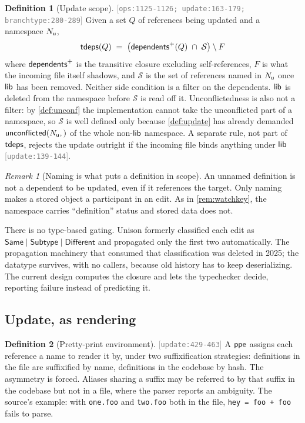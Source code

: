 \documentclass[11pt]{article}
\theoremstyle{definition}
\newtheorem{definition}{Definition}[section]
\theoremstyle{plain}
\theoremstyle{remark}
\newtheorem{remark}{Remark}[section]
\newcommand{\src}[1]{{\footnotesize\textcolor{gray}{[\texttt{#1}]}}}
\begin{document}
\begin{definition}[Update scope]\label{def:uscope}
\src{ops:1125-1126; update:163-179; branchtype:280-289} Given a set $Q$ of references being updated
and a namespace $N_{\mathsf{u}}$,
\[
  \mathsf{tdeps}(Q) \;=\; \bigl(\mathsf{dependents}^{+}(Q) \;\cap\; \mathcal{S}\bigr) \setminus F
\]
where $\mathsf{dependents}^{+}$ is the transitive closure excluding self-references, $F$ is what the incoming
file itself shadows, and $\mathcal{S}$ is the set of references named in $N_{\mathsf{u}}$ once $\mathsf{lib}$ has
been removed. Neither side condition is a filter on the dependents. $\mathsf{lib}$ is deleted from the
namespace before $\mathcal{S}$ is read off it. Unconflictedness is also not a filter: by
\cref{def:unconf} the implementation cannot take the unconflicted part of a namespace, so
$\mathcal{S}$ is well defined only because \cref{def:update} has already demanded
$\mathsf{unconflicted}(N_{\mathsf{u}},)$ of the whole non-$\mathsf{lib}$ namespace. A separate rule, not part of $\mathsf{tdeps}$, rejects
the update outright if the incoming file binds anything under $\mathsf{lib}$ \src{update:139-144}.
\end{definition}

\begin{remark}[Naming is what puts a definition in scope]\label{rem:scopenaming}
An unnamed definition is not a dependent to be updated, even if it references the target. Only naming
makes a stored object a participant in an edit. As in \cref{rem:watchkey}, the namespace carries
``definition'' status and stored data does not.

There is no type-based gating. Unison formerly classified each edit as
$\mathsf{Same} \mid \mathsf{Subtype} \mid \mathsf{Different}$ and propagated only the first two
automatically. The propagation machinery that consumed that classification was deleted in 2025; the
datatype survives, with no callers, because old history has to keep deserializing. The current design
computes the closure and lets the typechecker decide, reporting failure instead of predicting it.
\end{remark}

\subsection{Update, as rendering}

\begin{definition}[Pretty-print environment]\label{def:ppe}
\src{update:429-463} A $\mathsf{ppe}$ assigns each reference a name to render it by, under two
suffixification strategies: definitions in the file are suffixified by name, definitions in the
codebase by hash. The asymmetry is forced. Aliases sharing a suffix may be referred to by that suffix
in the codebase but not in a file, where the parser reports an ambiguity. The source's example: with
\texttt{one.foo} and \texttt{two.foo} both in the file, \texttt{hey = foo + foo} fails to parse.
\end{definition}
\end{document}
